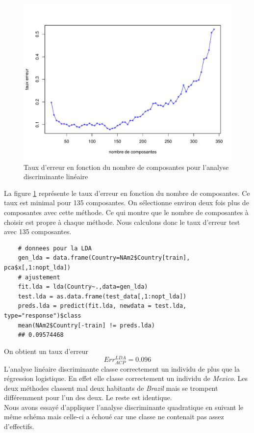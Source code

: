\documentclass[12pt,a4paper]{article}
\begin{document}
\begin{figure}[h!]
	\begin{center}
		\includegraphics[scale=0.5]{figures/nopt_lda.pdf}
		\caption{Taux d'erreur en fonction du nombre de composantes pour l'analyse discriminante linéaire}
		\label{fig:nopt_lda}
	\end{center}
\end{figure}
\noindent La figure \ref{fig:nopt_lda} représente le taux d'erreur en fonction du nombre de composantes. Ce taux est minimal pour 135 composantes. On sélectionne environ deux fois plus de composantes avec cette méthode. Ce qui montre que le nombre de composantes à choisir est propre à chaque méthode. Nous calculons donc le taux d'erreur test avec 135 composantes.\vspace{2mm}
\begin{lstlisting}
	# donnees pour la LDA
	gen_lda = data.frame(Country=NAm2$Country[train], pca$x[,1:nopt_lda])
	# ajustement
	fit.lda = lda(Country~.,data=gen_lda)
	test.lda = as.data.frame(test_data[,1:nopt_lda])
	preds.lda = predict(fit.lda, newdata = test.lda, type="response")$class
	mean(NAm2$Country[-train] != preds.lda)
	## 0.09574468
\end{lstlisting}
On obtient un taux d'erreur \vspace{-3mm}\[Err_{ACP}^{LDA} = 0.096\]
L'analyse linéaire discriminante classe correctement un individu de plus que la régression logistique. En effet elle classe correctement un individu de \textit{Mexico}. Les deux méthodes classent mal deux habitants de \textit{Brazil} mais se trompent différemment pour l'un des deux. Le reste est identique. \vspace{4mm}\\
Nous avons essayé d'appliquer l'analyse discriminante quadratique en suivant le même schéma mais celle-ci a échoué car une classe ne contenait pas assez d'effectifs.
\end{document}
